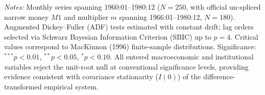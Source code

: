 \begin{table}[htbp]
\begin{minipage}{0.95\textwidth}
\vspace{0.3em}
\footnotesize \textit{Notes:} Monthly series spanning 1960:01--1980:12 ($N=250$, with official un-spliced narrow money $M1$ and multiplier $m$ spanning 1966:01--1980:12, $N=180$). Augmented Dickey--Fuller (ADF) tests estimated with constant drift; lag orders selected via Schwarz Bayesian Information Criterion (SBIC) up to $p=4$. Critical values correspond to MacKinnon (1996) finite-sample distributions. Significance: $^{***} p < 0.01$, $^{**} p < 0.05$, $^{*} p < 0.10$. All entered macroeconomic and institutional variables reject the unit-root null at conventional significance levels, providing evidence consistent with covariance stationarity ($I(0)$) of the difference-transformed empirical system.
\end{minipage}
\end{table}
